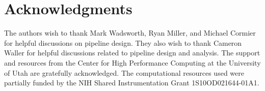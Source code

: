 \documentclass[11pt, a4paper, oneside]{article}
\begin{document}
\section*{Acknowledgments}
The authors wish to thank Mark Wadsworth, Ryan Miller, and Michael Cormier for helpful discussions on pipeline design. They also wish to thank Cameron Waller for helpful discussions related to pipeline design and analysis. The support and resources from the Center for High Performance Computing at the University of Utah are gratefully acknowledged. The computational resources used were partially funded by the NIH Shared Instrumentation Grant 1S10OD021644-01A1.




\end{document}
